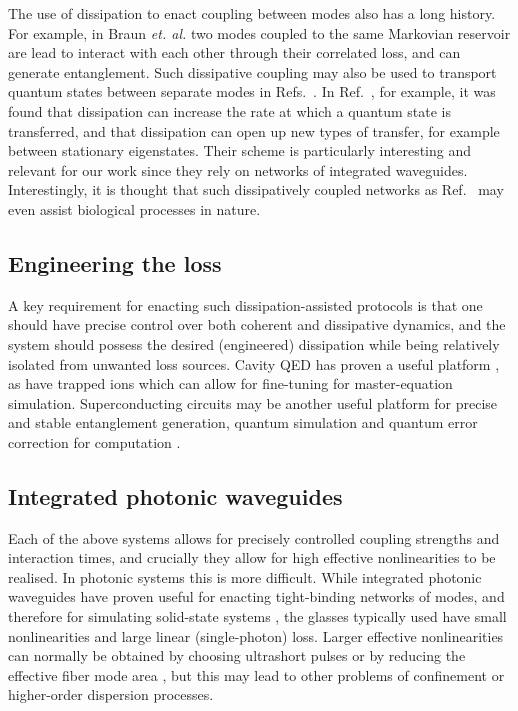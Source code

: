 The use of dissipation to enact coupling between modes also has a long history. For example, in Braun \emph{et. al.} \cite{Braun2002} two modes coupled to the same Markovian reservoir are lead to interact with each other through their correlated loss, and can generate entanglement. Such dissipative coupling may also be used to transport quantum states between separate modes in Refs.~\cite{Metelmann2015, Porras2019, Biggerstaff2016, Mogilevtsev2015, Xuereb2018}. In Ref.~\cite{Biggerstaff2016}, for example, it was found that dissipation can increase the rate at which a quantum state is transferred, and that dissipation can open up new types of transfer, for example between stationary eigenstates. Their scheme is particularly interesting and relevant for our work since they rely on networks of integrated waveguides. Interestingly, it is thought that such dissipatively coupled networks as Ref.~\cite{Biggerstaff2016} may even assist biological processes in nature.

\subsection{Engineering the loss}

A key requirement for enacting such dissipation-assisted protocols is that one should have precise control over both coherent and dissipative dynamics, and the system should possess the desired (engineered) dissipation while being relatively isolated from unwanted loss sources. Cavity QED has proven a useful platform \cite{Clark2003}, as have trapped ions \cite{Barreiro2011, Poyatos1996} which can allow for fine-tuning for master-equation simulation. Superconducting circuits may be another useful platform for precise and stable entanglement generation, quantum simulation and quantum error correction for computation \cite{Kimchi-Schwartz2016, Kapit2017}.


\subsection{Integrated photonic waveguides}

Each of the above systems allows for precisely controlled coupling strengths and interaction times, and crucially they allow for high effective nonlinearities to be realised. In photonic systems this is more difficult. While integrated photonic waveguides have proven useful for enacting tight-binding networks of modes, and therefore for simulating solid-state systems \cite{Mukherjee2015, Vicencio2015}, the glasses typically used have small nonlinearities and large linear (single-photon) loss. Larger effective nonlinearities can normally be obtained by choosing ultrashort pulses or by reducing the effective fiber mode area \cite{Agrawal2008, Agrawal2012}, but this may lead to other problems of confinement or higher-order dispersion processes.

